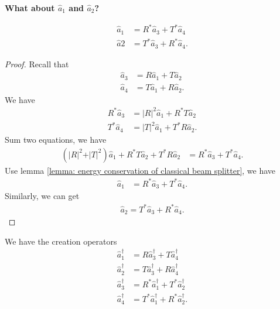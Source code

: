 \documentclass[../../note.tex]{subfiles}
\begin{document}
\textbf{What about $\hat{a}_1$ and $\hat{a}_2$?}
\begin{lemma}
    \begin{align}
        \hat{a}_1
        &= R^\ast \hat{a}_3 + T^\ast \hat{a}_4 \\
        \hat{a}{2}
        &= T^\ast \hat{a}_3 + R^\ast \hat{a}_4.
    \end{align}
\end{lemma}
\begin{proof}
    Recall that 
    \begin{align}
        \hat{a}_3 
        &= R \hat{a}_1 + T \hat{a}_2 \\
        \hat{a}_4 
        &= T \hat{a}_1 + R \hat{a}_2.
    \end{align}
    We have
    \begin{align}
        R^\ast \hat{a}_3
        &= \vert R \vert^2 \hat{a}_1 + R^\ast T \hat{a}_2 \\
        T^\ast \hat{a}_4 
        &= \vert T \vert^2 \hat{a}_1 + T^\ast R \hat{a}_2.
    \end{align}
    Sum two equations, we have
    \begin{align}
        (\vert R \vert^2 + \vert T \vert^2) \hat{a}_1 + R^\ast T \hat{a}_2 + T^\ast R \hat{a}_2 
        &= R^\ast \hat{a}_3 + T^\ast \hat{a}_4.
    \end{align}
    Use lemma \ref{lemma: energy conservation of classical beam splitter}, we have
    \begin{align}
        \hat{a}_1
        &= R^\ast \hat{a}_3 + T^\ast \hat{a}_4.
    \end{align}
    Similarly, we can get
    \begin{align}
        \hat{a}_2 = T^\ast \hat{a}_3 + R^\ast \hat{a}_4.
    \end{align}
\end{proof}

\begin{lemma}
    \label{lemma: creation operators}
    We have the creation operators
    \begin{align}
        \hat{a}_1^\dagger 
        &= R \hat{a}_3^\dagger + T \hat{a}_4^\dagger \\
        \hat{a}_2^\dagger
        &= T \hat{a}_3^\dagger + R \hat{a}_4^\dagger \\
        \hat{a}_3^\dagger
        &= R^\ast \hat{a}_1^\dagger + T^\ast \hat{a}_2^\dagger \\
        \hat{a}_4^\dagger
        &= T^\ast \hat{a}_1^\dagger + R^\ast \hat{a}_2^\dagger.
    \end{align}
\end{lemma}
\end{document}
